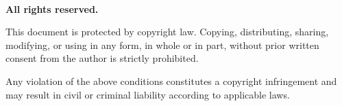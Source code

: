 \newpage
\begin{center}
  \vspace*{0.5cm}
  \textcopyright  ~\MyCopyrightYear ~\CopyrightAuthors
  \\\textbf{All rights reserved.}

  \vspace{0.5cm}
  This document is protected by copyright law.
  Copying, distributing, sharing, modifying, or using in any
  form, in whole or in part, without prior written consent from
  the author is strictly prohibited.

  \vspace{0.5cm}
  Any violation of the above conditions constitutes a copyright
  infringement and may result in civil or criminal liability
  according to applicable laws.
\end{center}
